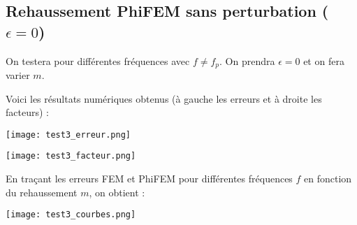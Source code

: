 \subsection{Rehaussement PhiFEM sans perturbation ($\epsilon=0$)}

On testera pour différentes fréquences avec $f\ne f_p$. On prendra $\epsilon=0$ et on fera varier $m$.

Voici les résultats numériques obtenus (à gauche les erreurs et à droite les facteurs) :

\begin{minipage}{0.52\linewidth}
	\centering
	\texttt{[image: test3\_erreur.png]}
\end{minipage}
\begin{minipage}{0.44\linewidth}
	\centering
	\texttt{[image: test3\_facteur.png]}
\end{minipage}

En traçant les erreurs FEM et PhiFEM pour différentes fréquences $f$ en fonction du rehaussement $m$, on obtient :

\begin{minipage}{\linewidth}
	\centering
	\texttt{[image: test3\_courbes.png]}
\end{minipage}